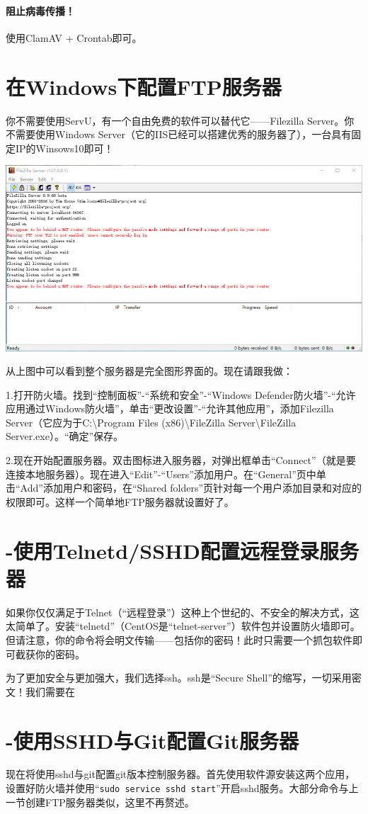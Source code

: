 \paragraph{阻止病毒传播！}使用ClamAV + Crontab即可。
\section{在Windows下配置FTP服务器}
你不需要使用ServU，有一个自由免费的软件可以替代它——Filezilla Server。你不需要使用Windows Server（它的IIS已经可以搭建优秀的服务器了），一台具有固定IP的Winsows10即可！
\begin{center}
	\includegraphics[width=0.7\linewidth]{pic/fzs}
\end{center} \par
从上图中可以看到整个服务器是完全图形界面的。现在请跟我做：\par
1.打开防火墙。找到“控制面板”-“系统和安全”-“Windows Defender防火墙”-“允许应用通过Windows防火墙”，单击“更改设置”-“允许其他应用”，添加Filezilla Server（它应为于C:\textbackslash Program Files (x86)\textbackslash FileZilla Server\textbackslash FileZilla Server.exe）。“确定”保存。\par
2.现在开始配置服务器。双击图标进入服务器，对弹出框单击“Connect”（就是要连接本地服务器）。现在进入“Edit”-“Users”添加用户。在“General”页中单击“Add”添加用户和密码，在“Shared folders”页针对每一个用户添加目录和对应的权限即可。这样一个简单地FTP服务器就设置好了。
\section{-使用Telnetd/SSHD配置远程登录服务器}
如果你仅仅满足于Telnet（“远程登录”）这种上个世纪的、不安全的解决方式，这太简单了。安装“telnetd”（CentOS是“telnet-server”）软件包并设置防火墙即可。但请注意，你的命令将会明文传输——包括你的密码！此时只需要一个抓包软件即可截获你的密码。\par
为了更加安全与更加强大，我们选择ssh。ssh是“Secure Shell”的缩写，一切采用密文！我们需要在
\section{-使用SSHD与Git配置Git服务器}
现在将使用sshd与git配置git版本控制服务器。首先使用软件源安装这两个应用，设置好防火墙并使用“\verb|sudo service sshd start|”开启sshd服务。大部分命令与上一节创建FTP服务器类似，这里不再赘述。
